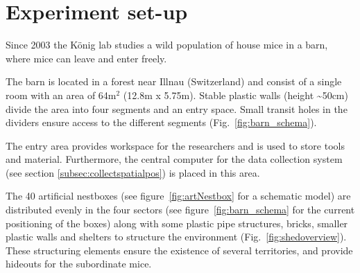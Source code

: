 \newpage
\section{Experiment set-up}
\label{sec:shedsetup}

Since 2003 the K\"onig lab studies a wild population of house mice in a barn, where mice can leave and enter freely.

The barn is located in a forest near Illnau (Switzerland) and consist of a single room with an area of 64m$^2$ (12.8m x 5.75m). Stable plastic walls (height \textasciitilde50cm) divide the area into four segments and an entry space. Small transit holes in the dividers ensure access to the different segments (Fig.~\ref{fig:barn_schema}).

The entry area provides workspace for the researchers and is used to store tools and material. Furthermore, the central computer for the data collection system (see section \ref{subsec:collectspatialpos}) is placed in this area.

The 40 artificial nestboxes (see figure~\ref{fig:artNestbox} for a schematic model) are distributed evenly in the four sectors (see figure~\ref{fig:barn_schema} for the current positioning of the boxes) along with some plastic pipe structures, bricks, smaller plastic walls and shelters to structure the environment (Fig.~\ref{fig:shedoverview}). These structuring elements ensure the existence of several territories, and provide hideouts for the subordinate mice.

